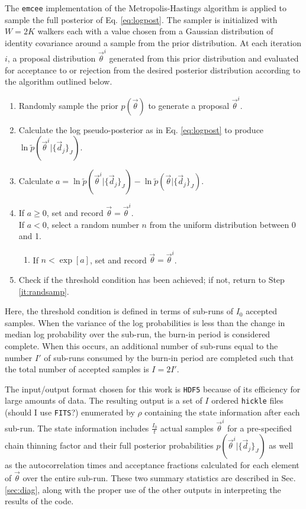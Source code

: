 \documentclass[preprint]{aastex}
\begin{document}
The \texttt{emcee} implementation of the Metropolis-Hastings algorithm is applied to sample the full posterior of Eq. \ref{eq:logpost}.   \citep{for12}   The sampler is initialized with $W=2K$ walkers each with a value chosen from a Gaussian distribution of identity covariance around a sample from the prior distribution.  At each iteration $i$, a proposal distribution $\vec{\theta}^{i}$ generated from this prior distribution and evaluated for acceptance to or rejection from the desired posterior distribution according to the algorithm outlined below.  

\begin{enumerate}
\item \label{it:randsamp} Randomly sample the prior $p(\vec{\theta})$ to generate a proposal $\vec{\theta}^{i}$.
\item Calculate the log pseudo-posterior as in Eq. \ref{eq:logpost} to produce $\ln\tilde{p}(\vec{\theta}^{i}|\{\vec{d}_{j}\}_{J})$.
\item Calculate $a=\ln\tilde{p}(\vec{\theta}^{i}|\{\vec{d}_{j}\}_{J})-\ln\tilde{p}(\vec{\theta}|\{\vec{d}_{j}\}_{J})$.
\item If $a\geq0$, set and record $\vec{\theta}=\vec{\theta}^{i}$.\\
If $a<0$, select a random number $n$ from the uniform distribution between 0 and 1.
\begin{enumerate}
\item If $n<\exp[a]$, set and record $\vec{\theta}=\vec{\theta}^{i}$.
\end{enumerate}
\item Check if the threshold condition has been achieved; if not, return to Step \ref{it:randsamp}.
\end{enumerate}

Here, the threshold condition is defined in terms of sub-runs of $I_{0}$ accepted samples.  When the variance of the log probabilities is less than the change in median log probability over the sub-run, the burn-in period is considered complete.  When this occurs, an additional number of sub-runs equal to the number $I'$ of sub-runs consumed by the burn-in period are completed such that the total number of accepted samples is $I=2I'$.  

The input/output format chosen for this work is \texttt{HDF5} because of its efficiency for large amounts of data.  The resulting output is a set of $I$ ordered \texttt{hickle} files (should I use \texttt{FITS}?) enumerated by $\rho$ containing the state information after each sub-run.  The state information includes $\frac{I_{0}}{t}$ actual samples $\vec{\theta}^{i}$ for a pre-specified chain thinning factor and their full posterior probabilities $p(\vec{\theta}^{i}|\{\vec{d}_{j}\}_{J})$ as well as the autocorrelation times and acceptance fractions calculated for each element of $\vec{\theta}$ over the entire sub-run.  These two summary statistics are described in Sec. \ref{sec:diag}, along with the proper use of the other outputs in interpreting the results of the code.
\end{document}
